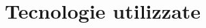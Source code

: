 \documentclass[../SpecificaTecnica.tex]{subfiles}
\begin{document}
\section{Tecnologie utilizzate}
\end{document}
